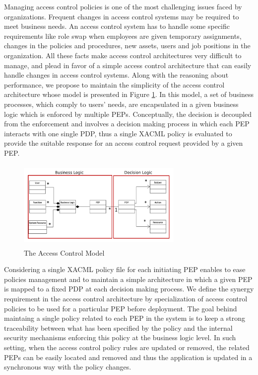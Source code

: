 Managing access control policies is one of the most challenging issues faced by organizations. 
Frequent changes in access control systems may be required to meet business needs. An access control system has to handle some specific 
requirements like role swap when employees are given temporary assignments, changes in the policies and procedures, 
new assets, users and job positions in the organization.
All these facts make access control architectures very difficult to manage, and plead in favor of a 
simple access control architecture that can easily handle changes in access control systems. 
Along with the reasoning about performance, we propose to maintain the simplicity of the access control architecture whose model 
is presented in Figure \ref{model}. In this model, a set of business processes, which comply to users' needs, are encapsulated in a given business logic 
which is enforced by multiple PEPs. Conceptually, the decision is decoupled from the enforcement and involves a decision making process in which each PEP interacts 
with one single PDP, thus a single XACML policy is evaluated to provide the suitable response for an access control request provided by a given PEP. 
\begin{figure}[!h]
\begin{center}
\includegraphics[height=4.3cm,width=8cm]{model}
\caption{The Access Control Model}
\label{model}
\end{center}
\end{figure}

Considering a single XACML policy file for each initiating PEP enables to ease policies management and to maintain a simple architecture 
in which a given PEP is mapped to a fixed PDP at each decision making process. We define the synergy requirement in the access control 
architecture by specialization of access control policies to be used for a particular PEP before deployment. The goal behind maintaing a single 
policy related to each PEP in the system is to keep a strong traceability between what has been specified by the policy and the internal 
security mechanisms enforcing this policy at the business logic level. In such setting, when the access control policy rules are updated or removed, 
the related PEPs can be easily located and removed and thus the application is updated in a synchronous way with the policy changes. 

